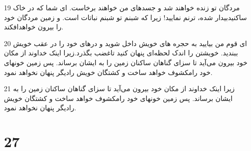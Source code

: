 \par 19 مردگان تو زنده خواهند شد و جسدهای من خواهند برخاست. ای شما که در خاک ساکنیدبیدار شده، ترنم نمایید! زیرا که شبنم تو شبنم نباتات است. و زمین مردگان خود را بیرون خواهدافکند.
\par 20 ‌ای قوم من بیایید به حجره های خویش داخل شوید و درهای خود را در عقب خویش ببندید. خویشتن را اندک لحظه‌ای پنهان کنید تاغضب بگذرد.زیرا اینک خداوند از مکان خود بیرون می‌آید تا سزای گناهان ساکنان زمین را به ایشان برساند. پس زمین خونهای خود رامکشوف خواهد ساخت و کشتگان خویش رادیگر پنهان نخواهد نمود.
\par 21 زیرا اینک خداوند از مکان خود بیرون می‌آید تا سزای گناهان ساکنان زمین را به ایشان برساند. پس زمین خونهای خود رامکشوف خواهد ساخت و کشتگان خویش رادیگر پنهان نخواهد نمود.
 
\chapter{27}

